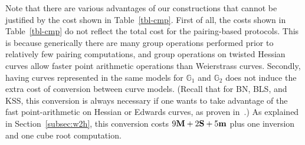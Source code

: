 Note that there are various advantages of our constructions that cannot be justified by the cost shown in Table~\ref{tbl-cmp}.
First of all, the costs shown in Table~\ref{tbl-cmp} do not reflect the total cost for the pairing-based protocols.
This is because generically there are many group operations performed prior to relatively few pairing computations,
and group operations on twisted Hessian curves allow faster point arithmetic operations than Weierstrass curves.
Secondly, having curves represented in the same models for $\mathbb{G}_1$ and $\mathbb{G}_2$ does not induce the extra cost of conversion between curve models.
(Recall that for BN, BLS, and KSS, this conversion is always necessary if one wants to take advantage of
the fast point-arithmetic on Hessian or Edwards curves, as proven in~\cite{2013/bos-pairing}.)
As explained in Section~\ref{subsec:w2h}, 
this conversion costs $9\textbf{M} + 2\textbf{S} + 5\textbf{m}$ plus one inversion and one cube root computation.


%
%
%



